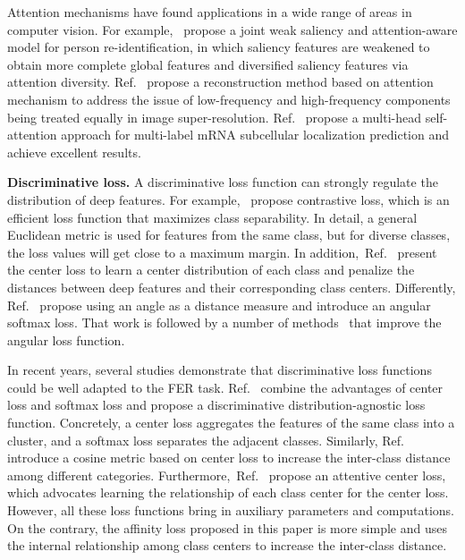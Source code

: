 \documentclass{article}
\begin{document}
{Attention mechanisms have found applications in a wide range of areas in computer vision. For example,}~\cite{ning2021jwsaa} {propose a joint weak saliency and attention-aware model for person re-identification, in which saliency features are weakened to obtain more complete global features and diversified saliency features via attention diversity.} 
{Ref.}~\cite{chen2021image} {propose a reconstruction method based on attention mechanism to address the issue of low-frequency and high-frequency components being treated equally in image super-resolution.}
{Ref.}~\cite{wang2021dm3loc} {propose a multi-head self-attention approach for multi-label mRNA subcellular localization prediction and achieve excellent results.}

 
\noindent\textbf{{Discriminative loss.}} A discriminative loss function can strongly regulate the distribution of deep features. For example,~\cite{hadsell2006dimensionality} propose contrastive loss, which is an efficient loss function that maximizes class separability. In detail, a general Euclidean metric is used for features from the same class, but for diverse classes, the loss values will get close to a maximum margin. In addition,~{Ref.}~\cite{wen2016discriminative} present the center loss to learn a center distribution of each class and penalize the distances between deep features and their corresponding class centers. Differently, {Ref.}~\cite{liu2017sphereface} propose using an angle as a distance measure and introduce an angular softmax loss. That work is followed by a number of methods~\cite{liu2017learning,wang2018cosface,deng2019arcface} that improve the angular loss function.

In recent years, several studies demonstrate that discriminative loss functions could be well adapted to the FER task. {Ref.}~\cite{farzaneh2020discriminant} combine the advantages of center loss and softmax loss and propose a discriminative distribution-agnostic loss function. Concretely, a center loss aggregates the features of the same class into a cluster, and a softmax loss separates the adjacent classes. Similarly, {Ref.}~\cite{cai2018island} introduce a cosine metric based on center loss to increase the inter-class distance among different categories. Furthermore,~{Ref.}~\cite{farzaneh2021facial} propose an attentive center loss, which advocates learning the relationship of each class center for the center loss. However, all these loss functions bring in auxiliary parameters and computations. On the contrary, the affinity loss proposed in this paper is more simple and uses the internal relationship among class centers to increase the inter-class distance.
\end{document}
